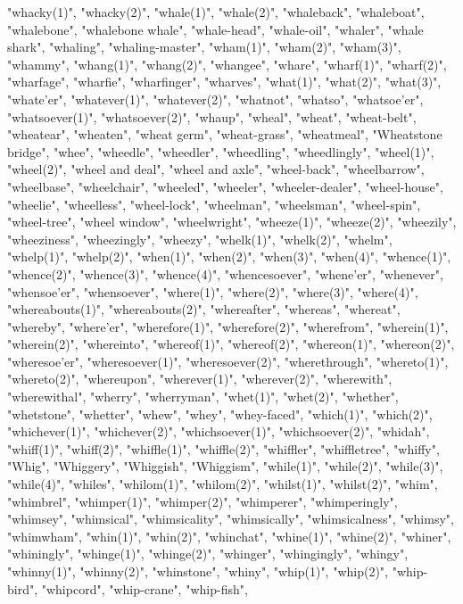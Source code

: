 "whacky(1)",
"whacky(2)",
"whale(1)",
"whale(2)",
"whaleback",
"whaleboat",
"whalebone",
"whalebone whale",
"whale-head",
"whale-oil",
"whaler",
"whale shark",
"whaling",
"whaling-master",
"wham(1)",
"wham(2)",
"wham(3)",
"whammy",
"whang(1)",
"whang(2)",
"whangee",
"whare",
"wharf(1)",
"wharf(2)",
"wharfage",
"wharfie",
"wharfinger",
"wharves",
"what(1)",
"what(2)",
"what(3)",
"whate'er",
"whatever(1)",
"whatever(2)",
"whatnot",
"whatso",
"whatsoe'er",
"whatsoever(1)",
"whatsoever(2)",
"whaup",
"wheal",
"wheat",
"wheat-belt",
"wheatear",
"wheaten",
"wheat germ",
"wheat-grass",
"wheatmeal",
"Wheatstone bridge",
"whee",
"wheedle",
"wheedler",
"wheedling",
"wheedlingly",
"wheel(1)",
"wheel(2)",
"wheel and deal",
"wheel and axle",
"wheel-back",
"wheelbarrow",
"wheelbase",
"wheelchair",
"wheeled",
"wheeler",
"wheeler-dealer",
"wheel-house",
"wheelie",
"wheelless",
"wheel-lock",
"wheelman",
"wheelsman",
"wheel-spin",
"wheel-tree",
"wheel window",
"wheelwright",
"wheeze(1)",
"wheeze(2)",
"wheezily",
"wheeziness",
"wheezingly",
"wheezy",
"whelk(1)",
"whelk(2)",
"whelm",
"whelp(1)",
"whelp(2)",
"when(1)",
"when(2)",
"when(3)",
"when(4)",
"whence(1)",
"whence(2)",
"whence(3)",
"whence(4)",
"whencesoever",
"whene'er",
"whenever",
"whensoe'er",
"whensoever",
"where(1)",
"where(2)",
"where(3)",
"where(4)",
"whereabouts(1)",
"whereabouts(2)",
"whereafter",
"whereas",
"whereat",
"whereby",
"where'er",
"wherefore(1)",
"wherefore(2)",
"wherefrom",
"wherein(1)",
"wherein(2)",
"whereinto",
"whereof(1)",
"whereof(2)",
"whereon(1)",
"whereon(2)",
"wheresoe'er",
"wheresoever(1)",
"wheresoever(2)",
"wherethrough",
"whereto(1)",
"whereto(2)",
"whereupon",
"wherever(1)",
"wherever(2)",
"wherewith",
"wherewithal",
"wherry",
"wherryman",
"whet(1)",
"whet(2)",
"whether",
"whetstone",
"whetter",
"whew",
"whey",
"whey-faced",
"which(1)",
"which(2)",
"whichever(1)",
"whichever(2)",
"whichsoever(1)",
"whichsoever(2)",
"whidah",
"whiff(1)",
"whiff(2)",
"whiffle(1)",
"whiffle(2)",
"whiffler",
"whiffletree",
"whiffy",
"Whig",
"Whiggery",
"Whiggish",
"Whiggism",
"while(1)",
"while(2)",
"while(3)",
"while(4)",
"whiles",
"whilom(1)",
"whilom(2)",
"whilst(1)",
"whilst(2)",
"whim",
"whimbrel",
"whimper(1)",
"whimper(2)",
"whimperer",
"whimperingly",
"whimsey",
"whimsical",
"whimsicality",
"whimsically",
"whimsicalness",
"whimsy",
"whimwham",
"whin(1)",
"whin(2)",
"whinchat",
"whine(1)",
"whine(2)",
"whiner",
"whiningly",
"whinge(1)",
"whinge(2)",
"whinger",
"whingingly",
"whingy",
"whinny(1)",
"whinny(2)",
"whinstone",
"whiny",
"whip(1)",
"whip(2)",
"whip-bird",
"whipcord",
"whip-crane",
"whip-fish",
